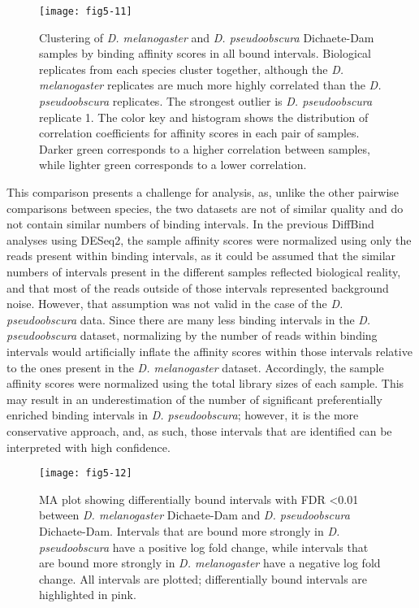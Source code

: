 \begin{figure}
\centering
\texttt{[image: fig5-11]}
\caption{Clustering of \emph{D. melanogaster} and \emph{D. pseudoobscura} Dichaete-Dam samples by binding affinity scores in all bound intervals. Biological replicates from each species cluster  together, although the \emph{D. melanogaster} replicates are much more highly correlated than the \emph{D. pseudoobscura} replicates. The strongest outlier is \emph{D. pseudoobscura} replicate 1. The color key and histogram shows the distribution of correlation coefficients for affinity scores in each pair of samples. Darker green corresponds to a higher correlation between samples, while lighter green corresponds to a lower correlation.}
\label{Figure 5.11}
\end{figure}

This comparison presents a challenge for analysis, as, unlike the other pairwise comparisons between species, the two datasets are not of similar quality and do not contain similar numbers of binding intervals. In the previous DiffBind analyses using DESeq2, the sample affinity scores were normalized using only the reads present within binding intervals, as it could be assumed that the similar numbers of intervals present in the different samples reflected biological reality, and that most of the reads outside of those intervals represented background noise. However, that assumption was not valid in the case of the \emph{D. pseudoobscura} data. Since there are many less binding intervals in the \emph{D. pseudoobscura} dataset, normalizing by the number of reads within binding intervals would artificially inflate the affinity scores within those intervals relative to the ones present in the \emph{D. melanogaster} dataset. Accordingly, the sample affinity scores were normalized using the total library sizes of each sample. This may result in an underestimation of the number of significant preferentially enriched binding intervals in \emph{D. pseudoobscura}; however, it is the more conservative approach, and, as such, those intervals that are identified can be interpreted with high confidence.\\

\begin{figure}
\centering
\texttt{[image: fig5-12]}
\caption{MA plot showing differentially bound intervals with FDR \textless 0.01 between \emph{D. melanogaster} Dichaete-Dam and \emph{D. pseudoobscura} Dichaete-Dam. Intervals that are bound more strongly in \emph{D. pseudoobscura} have a positive log fold change, while intervals that are bound more strongly in \emph{D. melanogaster} have a negative log fold change. All intervals are plotted; differentially bound intervals are highlighted in pink.}
\label{Figure 5.12}
\end{figure}

